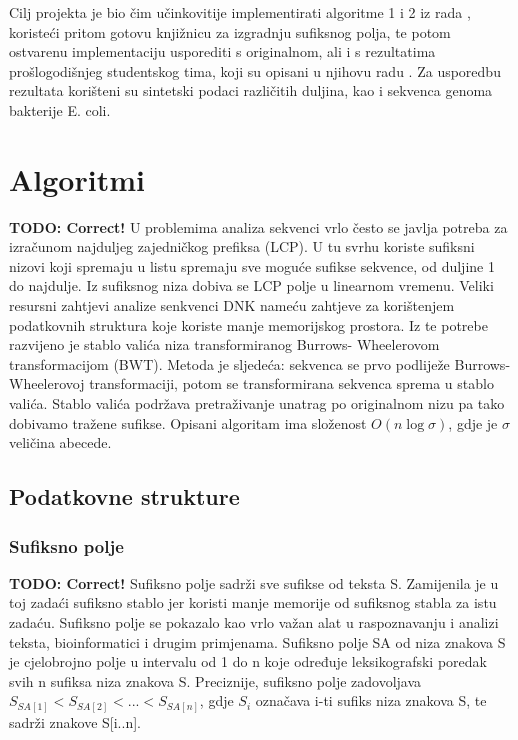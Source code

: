 \documentclass[a4paper,12pt]{article}
\begin{document}
Cilj projekta je bio čim učinkovitije implementirati algoritme 1 i 2 iz rada \cite{beller2013}, koristeći pritom gotovu knjižnicu za izgradnju sufiksnog polja, te potom ostvarenu implementaciju usporediti s originalnom, ali i s rezultatima prošlogodišnjeg studentskog tima, koji su opisani u njihovu radu \cite{studenti2017}. Za usporedbu rezultata korišteni su sintetski podaci različitih duljina, kao i sekvenca genoma bakterije E. coli.

\newpage

\section{Algoritmi}
\textbf{TODO: Correct!}
U problemima analiza sekvenci vrlo često se javlja potreba za izračunom najduljeg zajedničkog prefiksa (LCP). U tu svrhu koriste sufiksni nizovi koji spremaju u listu spremaju sve moguće sufikse sekvence, od duljine 1 do najdulje. Iz sufiksnog niza dobiva se LCP polje u linearnom vremenu. 
Veliki resursni zahtjevi analize senkvenci DNK nameću zahtjeve za korištenjem podatkovnih struktura koje koriste manje memorijskog prostora. Iz te potrebe razvijeno je stablo valića niza transformiranog Burrows- Wheelerovom transformacijom (BWT).
Metoda je sljedeća: sekvenca se prvo podliježe Burrows- Wheelerovoj transformaciji, potom se transformirana sekvenca sprema u stablo valića. Stablo valića podržava pretraživanje unatrag po originalnom nizu pa tako dobivamo tražene sufikse. Opisani algoritam ima složenost $O(n\log\sigma)$, gdje je $\sigma$ veličina abecede.

\subsection{Podatkovne strukture}

\subsubsection{Sufiksno polje}
\textbf{TODO: Correct!}
Sufiksno polje sadrži sve sufikse od teksta S. Zamijenila je u toj zadaći sufiksno stablo jer koristi manje memorije od sufiksnog stabla za istu zadaću. Sufiksno polje se pokazalo kao vrlo važan alat u raspoznavanju i analizi teksta, bioinformatici i drugim primjenama. 
Sufiksno polje SA od niza znakova S je cjelobrojno polje u intervalu od 1 do n koje određuje leksikografski poredak svih n sufiksa niza znakova S. Preciznije, sufiksno polje zadovoljava $ S_{SA[1]} < S_{SA[2]} < ... < S_{SA[n]}$, gdje $ S_i $ označava i-ti sufiks niza znakova S, te sadrži znakove S[i..n].
 
\end{document}
